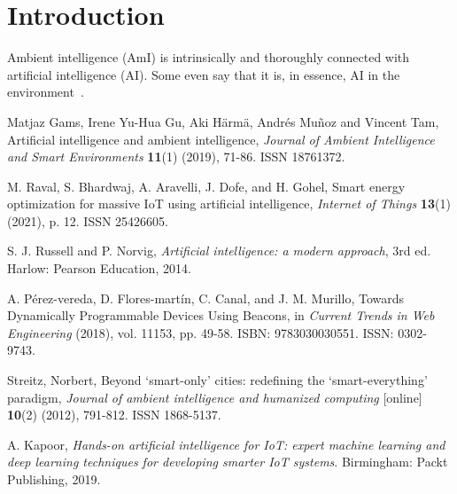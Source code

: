 \documentclass[ais]{iosart2x}
\begin{document}
\section{Introduction}

Ambient intelligence (AmI) is intrinsically and thoroughly connected with artificial intelligence (AI).
Some even say that it is, in essence, AI in the environment~\cite{1}.

\begin{thebibliography}{0}

 Matjaz Gams, Irene Yu-Hua Gu, Aki Härmä, Andrés Muñoz and Vincent Tam,
{Artificial intelligence and ambient intelligence},
{\textit{Journal of Ambient Intelligence and Smart Environments}} \textbf{11}(1) (2019), 71-86. ISSN 18761372. 

 M. Raval, S. Bhardwaj, A. Aravelli, J. Dofe, and H. Gohel,
{Smart energy optimization for massive IoT using artificial intelligence},
{\textit{Internet of Things}} \textbf{13}(1) (2021), p. 12. ISSN 25426605. 

 S. J. Russell and P. Norvig,
\textit{Artificial intelligence: a modern approach}, 3rd ed. Harlow: Pearson Education, 2014.

 A. Pérez-vereda, D. Flores-martín, C. Canal, and J. M. Murillo,
{Towards Dynamically Programmable Devices Using Beacons},
in {\textit{Current Trends in Web Engineering}} (2018), vol. 11153, pp. 49-58. ISBN: 9783030030551. ISSN: 0302-9743. 

  Streitz, Norbert,
{Beyond ‘smart-only’ cities: redefining the ‘smart-everything’ paradigm},
{\textit{Journal of ambient intelligence and humanized computing}} [online] \textbf{10}(2) (2012), 791-812. ISSN 1868-5137. 

 A. Kapoor,
\textit{Hands-on artificial intelligence for IoT: expert machine learning and deep learning techniques for developing smarter IoT systems}. Birmingham: Packt Publishing, 2019.

\end{thebibliography}
\end{document}
